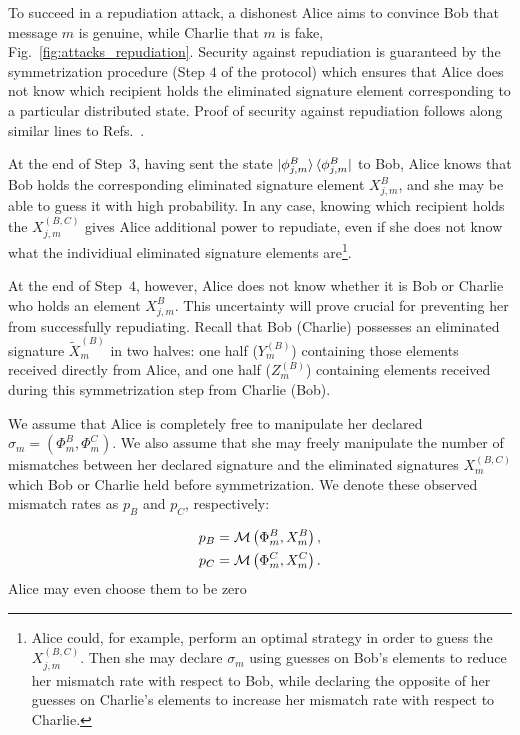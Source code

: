 To succeed in a repudiation attack, a dishonest Alice aims to convince Bob that message $m$ is genuine, while Charlie that $m$ is fake, Fig.~\ref{fig:attacks_repudiation}. Security against repudiation is guaranteed by the symmetrization procedure (Step $4$ of the protocol) which ensures that Alice does not know which recipient holds the eliminated signature element corresponding to a particular distributed state. Proof of security against repudiation follows along similar lines to Refs.~\cite{Dunjko2014, Wallden2015, Donaldson2016, Croal2016, Thornton2019}.

At the end of Step~$3$, having sent the state $\ket{\phi_{j, m}^B}\bra{\phi_{j, m}^B}$ to Bob, Alice knows that Bob holds the corresponding eliminated signature element $X_{j, m}^B$, and she may be able to guess it with high probability. In any case, knowing which recipient holds the $X_{j, m}^{\left(B, C\right)}$ gives Alice additional power to repudiate, even if she does not know what the individiual eliminated signature elements are\footnote{Alice could, for example, perform an optimal strategy in order to guess the $X_{j, m}^{\left(B, C\right)}$. Then she may declare $\sigma_m$ using guesses on Bob's elements to reduce her mismatch rate with respect to Bob, while declaring the opposite of her guesses on Charlie's elements to increase her mismatch rate with respect to Charlie.}.

At the end of Step~$4$, however, Alice does not know whether it is Bob or Charlie who holds an element $X_{j, m}^B$. This uncertainty will prove crucial for preventing her from successfully repudiating. Recall that Bob  (Charlie) possesses an eliminated signature $\tilde{X}_m^{\left(B\right)}$ in two halves: one half ($Y_m^{\left(B\right)}$) containing those elements received directly from Alice, and one half ($Z_m^{\left(B\right)}$) containing elements received during this symmetrization step from Charlie (Bob).

We assume that Alice is completely free to manipulate her declared $\sigma_m = \left(\Phi_m^B, \Phi_m^C\right)$. We also assume that she may freely manipulate the number of mismatches %
between her declared signature and the eliminated signatures $X_m^{\left(B, C\right)}$ which Bob or Charlie held before symmetrization. We denote these observed mismatch rates as $p_B$ and $p_C$, respectively: 

\begin{align}
p_B &= \mathcal{M}\left(\Phi_m^B, X_m^B\right), \notag \\
p_C &= \mathcal{M}\left(\Phi_m^C, X_m^C\right).
\end{align}
Alice may even choose them to be zero

